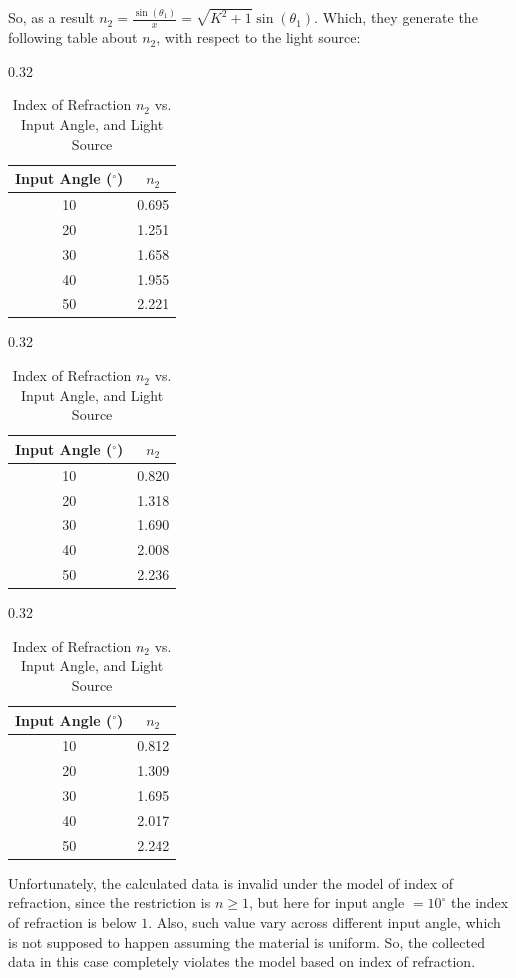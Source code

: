\documentclass{article}
\begin{document}
So, as a result $n_2 = \frac{\sin(\theta_1)}{x} = \sqrt{K^2+1}\sin(\theta_1)$. Which, they generate the following table about $n_2$, with respect to the light source:
\begin{table}[h!]
\centering

\begin{subtable}[t]{0.32\textwidth}
\centering
\begin{tabular}{c|| c}
\hline
\textbf{Input Angle ($^\circ$)} & \textbf{$n_2$} \\
\hline
10 & 0.695 \\
20 & 1.251 \\
30 & 1.658 \\
40 & 1.955 \\
50 & 2.221 \\
\hline
\end{tabular}
\caption{Red Light}
\end{subtable}
\hfill
\begin{subtable}[t]{0.32\textwidth}
\centering
\begin{tabular}{c ||c}
\hline
\textbf{Input Angle ($^\circ$)} & \textbf{$n_2$} \\
\hline
10 & 0.820 \\
20 & 1.318 \\
30 & 1.690 \\
40 & 2.008 \\
50 & 2.236 \\
\hline
\end{tabular}
\caption{Green Light}
\end{subtable}
\hfill
\begin{subtable}[t]{0.32\textwidth}
\centering
\begin{tabular}{c ||c}
\hline
\textbf{Input Angle ($^\circ$)} & \textbf{$n_2$} \\
\hline
10 & 0.812 \\
20 & 1.309 \\
30 & 1.695 \\
40 & 2.017 \\
50 & 2.242 \\
\hline
\end{tabular}
\caption{Blue Light}
\end{subtable}

\caption{Index of Refraction $n_2$ vs. Input Angle, and Light Source}
\end{table}

Unfortunately, the calculated data is invalid under the model of index of refraction, since the restriction is $n\geq 1$, but here for input angle $=10^\circ$ the index of refraction is below $1$. Also, such value vary across different input angle, which is not supposed to happen assuming the material is uniform. So, the collected data in this case completely violates the model based on index of refraction.
\end{document}
